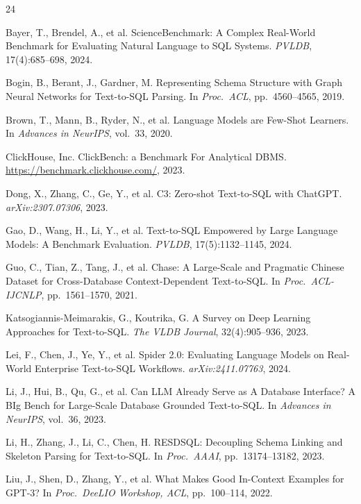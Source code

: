 \documentclass[sigconf, nonacm]{acmart}
\begin{document}
\begin{thebibliography}{24}

 Bayer, T., Brendel, A., et al. ScienceBenchmark: A Complex Real-World Benchmark for Evaluating Natural Language to SQL Systems. \emph{PVLDB}, 17(4):685--698, 2024.

 Bogin, B., Berant, J., Gardner, M. Representing Schema Structure with Graph Neural Networks for Text-to-SQL Parsing. In \emph{Proc.\ ACL}, pp.~4560--4565, 2019.

 Brown, T., Mann, B., Ryder, N., et al. Language Models are Few-Shot Learners. In \emph{Advances in NeurIPS}, vol.~33, 2020.

 ClickHouse, Inc. ClickBench: a Benchmark For Analytical DBMS. \url{https://benchmark.clickhouse.com/}, 2023.

 Dong, X., Zhang, C., Ge, Y., et al. C3: Zero-shot Text-to-SQL with ChatGPT. \emph{arXiv:2307.07306}, 2023.

 Gao, D., Wang, H., Li, Y., et al. Text-to-SQL Empowered by Large Language Models: A Benchmark Evaluation. \emph{PVLDB}, 17(5):1132--1145, 2024.

 Guo, C., Tian, Z., Tang, J., et al. Chase: A Large-Scale and Pragmatic Chinese Dataset for Cross-Database Context-Dependent Text-to-SQL. In \emph{Proc.\ ACL-IJCNLP}, pp.~1561--1570, 2021.

 Katsogiannis-Meimarakis, G., Koutrika, G. A Survey on Deep Learning Approaches for Text-to-SQL. \emph{The VLDB Journal}, 32(4):905--936, 2023.

 Lei, F., Chen, J., Ye, Y., et al. Spider 2.0: Evaluating Language Models on Real-World Enterprise Text-to-SQL Workflows. \emph{arXiv:2411.07763}, 2024.

 Li, J., Hui, B., Qu, G., et al. Can LLM Already Serve as A Database Interface? A BIg Bench for Large-Scale Database Grounded Text-to-SQL. In \emph{Advances in NeurIPS}, vol.~36, 2023.

 Li, H., Zhang, J., Li, C., Chen, H. RESDSQL: Decoupling Schema Linking and Skeleton Parsing for Text-to-SQL. In \emph{Proc.\ AAAI}, pp.~13174--13182, 2023.

 Liu, J., Shen, D., Zhang, Y., et al. What Makes Good In-Context Examples for GPT-3? In \emph{Proc.\ DeeLIO Workshop, ACL}, pp.~100--114, 2022.


\end{thebibliography}
\end{document}
